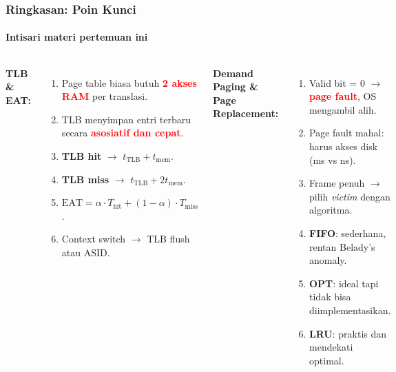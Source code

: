 \documentclass[t,aspectratio=169,xcolor=dvipsnames]{beamer}
\newcommand{\tem}[1]{\textbf{\textcolor{red}{#1}}}
\begin{document}
\begin{frame}
    \frametitle{Ringkasan: Poin Kunci}
    \framesubtitle{Intisari materi pertemuan ini}
    \small

    \begin{columns}[T]
        \textbf{TLB \& EAT:}
        \begin{enumerate}
            \item Page table biasa butuh \tem{2 akses RAM} per translasi.
            \item TLB menyimpan entri terbaru secara \tem{asosiatif dan cepat}.
            \item \textbf{TLB hit} $\rightarrow$ $t_{\text{TLB}} + t_{\text{mem}}$.
            \item \textbf{TLB miss} $\rightarrow$ $t_{\text{TLB}} + 2t_{\text{mem}}$.
            \item $\text{EAT} = \alpha \cdot T_{\text{hit}} + (1-\alpha) \cdot T_{\text{miss}}$.
            \item Context switch $\rightarrow$ TLB flush atau ASID.
        \end{enumerate}

        \textbf{Demand Paging \& Page Replacement:}
        \begin{enumerate}
            \item Valid bit = 0 $\rightarrow$ \tem{page fault}, OS mengambil alih.
            \item Page fault mahal: harus akses disk (ms vs ns).
            \item Frame penuh $\rightarrow$ pilih \textit{victim} dengan algoritma.
            \item \textbf{FIFO}: sederhana, rentan Belady's anomaly.
            \item \textbf{OPT}: ideal tapi tidak bisa diimplementasikan.
            \item \textbf{LRU}: praktis dan mendekati optimal.
        \end{enumerate}
    \end{columns}
\end{frame}
\end{document}
